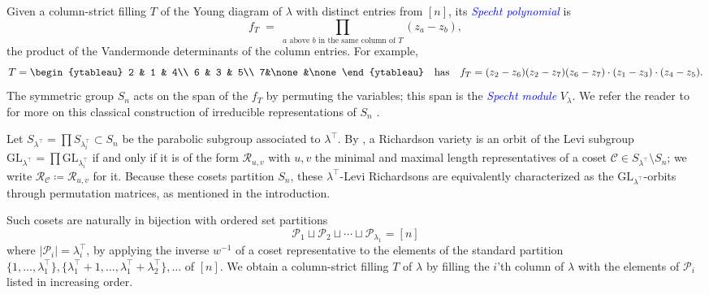 \documentclass[11pt]{amsart}
\theoremstyle{definition}
\numberwithin{equation}{section}
\newcommand{\GL}{\mathrm{GL}}
\renewcommand\emph[1]{\textcolor{blue}{\textit{#1}}} %
\begin{document}
Given a column-strict filling $T$ of the Young diagram of $\lambda$ with distinct entries from $[n]$, its \emph{Specht polynomial} is
\[
  f_T \;=\;  \prod_{a\text{ above $b$ in the same column of }T}(z_a-z_b),
\]
the product of the Vandermonde determinants of the column entries. For example,
$$T=\begin{ytableau}
    2 & 1 & 4\\
    6 & 3 & 5\\
    7&\none&\none\end{ytableau} \quad\text{has}\quad f_T=(z_2-z_6)(z_2-z_7)(z_6-z_7)\cdot (z_1-z_3)\cdot (z_4-z_5).$$
The symmetric group $S_n$ acts on the span of the $f_T$ by permuting the variables; this span is the \emph{Specht module} $V_\lambda$.
We refer the reader to \cite{Sag01} for more on this classical construction of irreducible representations of $S_n$ \cite{Sp35}.

Let $S_{\lambda^{\top}}=\prod S_{\lambda_{i}^{\top}}\subset S_n$ be the parabolic subgroup associated to  $\lambda^{\top}$.
By \cite[Proposition 2.5]{W13}, a Richardson variety is an orbit of the Levi subgroup $\GL_{\lambda^{\top}}=\prod \GL_{\lambda_{i}^{\top}}$ if and only if it is of the form $\mathcal{R}_{u,v}$ with $u,v$ the minimal and maximal length representatives of a coset $\mathcal{C}\in S_{\lambda^{\top}}\setminus S_n$; we write $\mathcal{R}_{\mathcal{C}}\coloneqq \mathcal{R}_{u,v}$ for it.
Because these cosets partition $S_n$, these $\lambda^{\top}$-Levi Richardsons are equivalently characterized as the $\GL_{\lambda^{\top}}$-orbits through permutation matrices, as mentioned in the introduction.

Such cosets are naturally in bijection with ordered set partitions $$\mathcal{P}_1\sqcup \mathcal{P}_2\sqcup \cdots \sqcup \mathcal{P}_{\lambda_1}=[n]$$
where $|\mathcal{P}_i|=\lambda_{i}^{\top}$, by applying the inverse $w^{-1}$ of a coset representative to the elements of the standard partition $\{1,\ldots,\lambda_1^{\top}\},\{\lambda_1^{\top}+1,\ldots,\lambda_1^{\top}+\lambda_2^{\top}\},\ldots $ of $[n]$.
We obtain a column-strict filling $T$ of $\lambda$ by filling the $i$'th column of $\lambda$ with the elements of $\mathcal{P}_i$ listed in increasing order.
\end{document}
